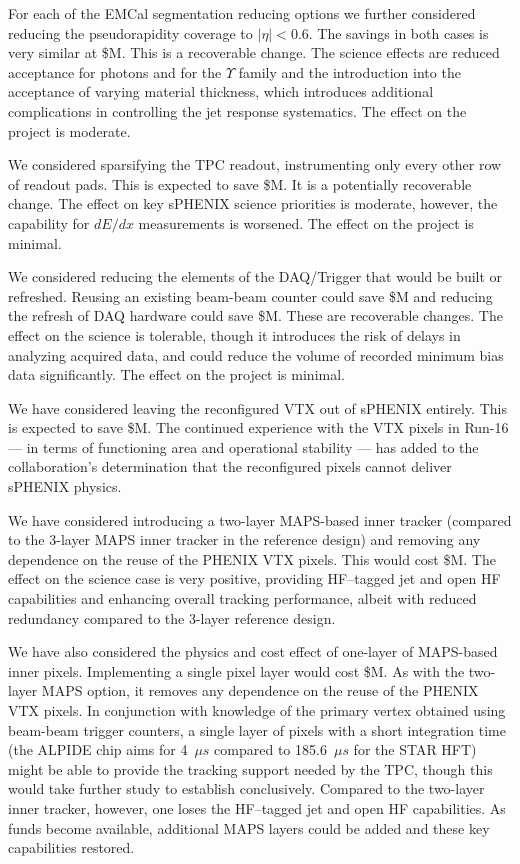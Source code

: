 For each of the EMCal segmentation reducing options we further
considered reducing the pseudorapidity coverage to $|\eta| < 0.6$.
The savings in both cases is very similar at \${\reducedEMCaleta}M.
This is a recoverable change.  The science effects are reduced
acceptance for photons and for the $\Upsilon$ family and the
introduction into the acceptance of varying material thickness, which
introduces additional complications in controlling the jet response
systematics. The effect on the project is moderate.

We considered sparsifying the TPC readout, instrumenting only every
other row of readout pads.  This is expected to save
\${\reducedTPCreadout}M.  It is a potentially recoverable change. The
effect on key sPHENIX science priorities is moderate, however, the
capability for $dE/dx$ measurements is worsened.  The effect on the
project is minimal.

We considered reducing the elements of the DAQ/Trigger that would be
built or refreshed.  Reusing an existing beam-beam counter could save
\${\reuseBBC}M and reducing the refresh of DAQ hardware could save
\${\reducedDAQ}M.  These are recoverable changes.  The effect on the
science is tolerable, though it introduces the risk of delays in
analyzing acquired data, and could reduce the volume of recorded
minimum bias data significantly. The effect on the project is minimal.

We have considered leaving the reconfigured VTX out of sPHENIX
entirely.  This is expected to save \${\noVTX}M.  The continued experience
with the VTX pixels in Run-16 --- in terms of functioning area and
operational stability --- has added to the collaboration's
determination that the reconfigured pixels cannot deliver sPHENIX
physics. 

We have considered introducing a two-layer MAPS-based inner tracker
(compared to the 3-layer MAPS inner tracker in the reference design)
and removing any dependence on the reuse of the PHENIX VTX pixels.
This would cost \${\twoLayerMAPS}M.  The effect on the science case is very
positive, providing HF--tagged jet and open HF capabilities and enhancing
overall tracking performance, albeit
with reduced redundancy compared to the 3-layer reference design. 

We have also considered the physics and cost effect of one-layer of
MAPS-based inner pixels.  Implementing a single pixel layer would cost
\${\oneLayerMAPS}M.  As with the two-layer MAPS option, it removes any
dependence on the reuse of the PHENIX VTX pixels.  In conjunction with
knowledge of the primary vertex obtained using beam-beam trigger
counters, a single layer of pixels with a short integration time (the
ALPIDE chip aims for 4~$\mu s$ compared to 185.6~$\mu s$ for the STAR
HFT) might be able to provide the tracking support needed by the TPC,
though this would take further study to establish conclusively.
Compared to the two-layer inner tracker, however, one loses the
HF--tagged jet and open HF capabilities.  As funds become available,
additional MAPS layers could be added and these key capabilities
restored.  






